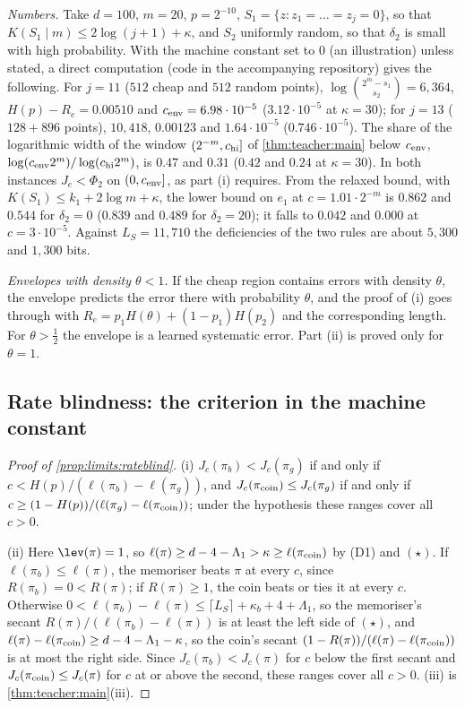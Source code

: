 \emph{Numbers.} Take $d=100$, $m=20$, $p=2^{-10}$, $S_1=\{z:z_1=\dots=z_j=0\}$, so that $K(S_1\mid m)\le2\log(j+1)+\kappa$, and $S_2$ uniformly random, so that $\delta_2$ is small with high probability. With the machine constant set to $0$ (an illustration) unless stated, a direct computation (code in the accompanying repository) gives the following. For $j=11$ ($512$ cheap and $512$ random points), $\log\binom{2^m-s_1}{s_2}=6{,}364$, $H(p)-R_e=0.00510$ and $c_{\rm env}=6.98\cdot10^{-5}$ ($3.12\cdot10^{-5}$ at $\kappa=30$); for $j=13$ ($128+896$ points), $10{,}418$, $0.00123$ and $1.64\cdot10^{-5}$ ($0.746\cdot10^{-5}$). The share of the logarithmic width of the window $(2^{-m},c_{\rm hi}]$ of \cref{thm:teacher:main} below $c_{\rm env}$, $\log(c_{\rm env}2^m)/\log(c_{\rm hi}2^m)$, is $0.47$ and $0.31$ ($0.42$ and $0.24$ at $\kappa=30$). In both instances $J_e<\Phi_2$ on $(0,c_{\rm env}]$, as part (i) requires. From the relaxed bound, with $K(S_1)\le k_1+2\log m+\kappa$, the lower bound on $e_1$ at $c=1.01\cdot2^{-m}$ is $0.862$ and $0.544$ for $\delta_2=0$ ($0.839$ and $0.489$ for $\delta_2=20$); it falls to $0.042$ and $0.000$ at $c=3\cdot10^{-5}$. Against $L_S=11{,}710$ the deficiencies of the two rules are about $5{,}300$ and $1{,}300$ bits.

\emph{Envelopes with density $\theta<1$.} If the cheap region contains errors with density $\theta$, the envelope predicts the error there with probability $\theta$, and the proof of (i) goes through with $R_e=p_1H(\theta)+(1-p_1)H(p_2)$ and the corresponding length. For $\theta>\frac12$ the envelope is a learned systematic error. Part (ii) is proved only for $\theta=1$.

\subsection{Rate blindness: the criterion in the machine constant}\label{app:limits:robust}

\begin{proof}[Proof of \cref{prop:limits:rateblind}]
(i) $J_c(\pi_b)<J_c(\pi_g)$ if and only if $c<H(p)/(\ell(\pi_b)-\ell(\pi_g))$, and $J_c(\pi_{\rm coin})\le J_c(\pi_g)$ if and only if $c\ge(1-H(p))/(\ell(\pi_g)-\ell(\pi_{\rm coin}))$; under the hypothesis these ranges cover all $c>0$.

(ii) Here $\lev(\pi)=1$, so $\ell(\pi)\ge d-4-\Lambda_1>\kappa\ge\ell(\pi_{\rm coin})$ by (D1) and $(\star)$. If $\ell(\pi_b)\le\ell(\pi)$, the memoriser beats $\pi$ at every $c$, since $R(\pi_b)=0<R(\pi)$; if $R(\pi)\ge1$, the coin beats or ties it at every $c$. Otherwise $0<\ell(\pi_b)-\ell(\pi)\le\lceil L_S\rceil+\kappa_b+4+\Lambda_1$, so the memoriser's secant $R(\pi)/(\ell(\pi_b)-\ell(\pi))$ is at least the left side of $(\star)$, and $\ell(\pi)-\ell(\pi_{\rm coin})\ge d-4-\Lambda_1-\kappa$, so the coin's secant $(1-R(\pi))/(\ell(\pi)-\ell(\pi_{\rm coin}))$ is at most the right side. Since $J_c(\pi_b)<J_c(\pi)$ for $c$ below the first secant and $J_c(\pi_{\rm coin})\le J_c(\pi)$ for $c$ at or above the second, these ranges cover all $c>0$. (iii) is \cref{thm:teacher:main}(iii).
\end{proof}

